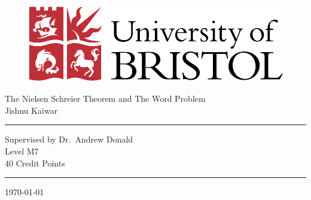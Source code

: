 \thispagestyle{empty}

\begin{figure}[h]
\begin{center}
\includegraphics[scale=0.5]{uob.pdf}
\end{center}
\end{figure}

\begin{center}
{\Large The Nielsen Schreier Theorem and The Word Problem\\ \vspace{1cm}Jishnu Kaiwar}
\end{center}

\vspace{3cm}
\hrule
\begin{center}
Supervised by Dr.\ Andrew Donald\\
Level M7\\
40 Credit Points
\end{center}
\hrule

\vspace{3cm}
\begin{center}
\today
\end{center}